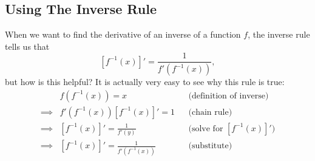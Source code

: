 \subsection{Using The Inverse Rule}

When we want to find the derivative of an inverse of a function $f$, the inverse rule tells us that
$$[f^{-1}(x)]'=\frac{1}{f'(f^{-1}(x))},$$
but how is this helpful? It is actually very easy to see why this rule is true:
\begin{align*}
         & f(f^{-1}(x)) = x & & \text{(definition of inverse)}\\
\implies & f'(f^{-1}(x))[f^{-1}(x)]'=1 & &\text{(chain rule)}\\
\implies & [f^{-1}(x)]' = \frac{1}{f'(y)} & & \text{(solve for $[f^{-1}(x)]'$)}\\
\implies & [f^{-1}(x)]' =\frac{1}{f'(f^{-1}(x))} & & \text{(substitute)}
\end{align*}

